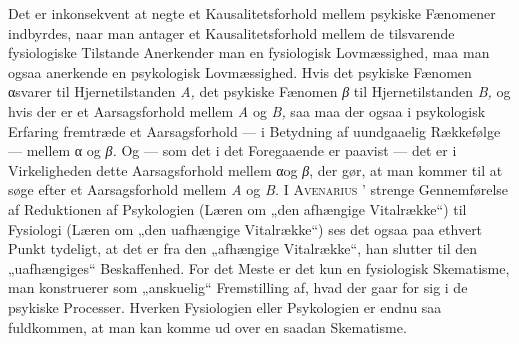 \documentclass[12pt,a4paper,openany]{book}
\begin{document}
Det er inkonsekvent at negte et Kausalitetsforhold mellem psykiske Fænomener
indbyrdes, naar man antager et Kausalitetsforhold mellem de tilsvarende
fysiologiske Tilstande Anerkender man en fysiologisk Lovmæssighed, maa man
ogsaa anerkende en psykologisk Lovmæssighed. Hvis det psykiske Fænomen αsvarer
til Hjernetilstanden \textit{A,} det psykiske Fænomen \textit{β} til
Hjernetilstanden \textit{B,} og hvis der er et Aarsagsforhold mellem \textit{A}
og \textit{B,} saa maa der ogsaa i psykologisk Erfaring fremtræde et
Aarsagsforhold --- i Betydning af uundgaaelig Rækkefølge --- mellem α og
\textit{β.} Og --- som det i det Foregaaende er paavist --- det er i
Virkeligheden dette Aarsagsforhold mellem αog \textit{β}, der gør, at man
kommer til at søge efter et Aarsagsforhold mellem \textit{A} og \textit{B.} I
\textsc{Avenarius} ' strenge Gennemførelse af Reduktionen af Psykologien (Læren
om „den afhængige Vitalrække“) til Fysiologi (Læren om „den uafhængige
Vitalrække“) ses det ogsaa paa ethvert Punkt tydeligt, at det er fra den
„afhængige Vitalrække“, han slutter til den „uafhængiges“ Beskaffenhed. For det
Meste er det kun en fysiologisk Skematisme, man konstruerer som „anskuelig“
Fremstilling af, hvad der gaar for sig i de psykiske Processer. Hverken
Fysiologien eller Psykologien er endnu saa fuldkommen, at man kan komme ud over
en saadan Skematisme.
\end{document}
